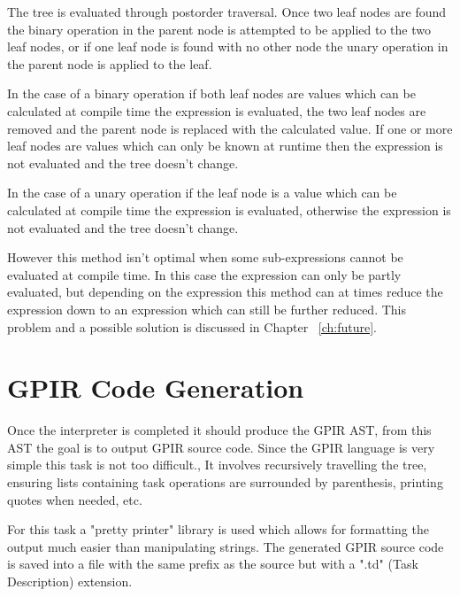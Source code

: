The tree is evaluated through
postorder traversal. Once two leaf nodes are found the binary operation in the parent node
is attempted to be applied to the two leaf nodes, or if one leaf node is found
with no other node the unary operation in the parent node is applied
to the leaf.  

In the case of a binary operation if both leaf nodes are values which
can be calculated at compile time the expression is evaluated, the two leaf nodes
are removed and the parent node is replaced with the calculated value. If one or
more leaf nodes are values which can only be known at runtime then the expression is
not evaluated and the tree doesn't change. 

In the case of a unary operation if the leaf node is a value which can be calculated
at compile time the expression is evaluated, otherwise the expression is not evaluated
and the tree doesn't change.

However this method isn't optimal when some sub-expressions cannot be
evaluated at compile time. In this case the expression can only be partly evaluated,
but depending on the expression this method can at times reduce the expression
down to an expression which can still be further reduced.
This problem and a possible solution is discussed in Chapter ~\ref{ch:future}.



\section{GPIR Code Generation}

Once the interpreter is completed it should produce the GPIR AST, 
from this AST the goal is to output GPIR source code.
Since the GPIR language is very simple this task is not too difficult.,
It involves recursively travelling the tree, ensuring lists containing task operations
are surrounded by parenthesis, printing quotes when needed, etc.

For this task a "pretty printer" library is used which allows for formatting
the output much easier than manipulating strings. The generated GPIR source code
is saved into a file with the same prefix as the source but with a ".td" (Task Description)
extension.
